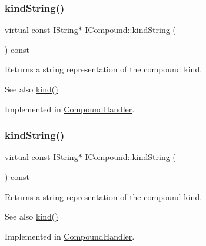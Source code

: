 \subsubsection{\texorpdfstring{kindString()}{kindString()}\hspace{0.1cm}{\footnotesize\ttfamily [1/2]}}
{\footnotesize\ttfamily virtual const \mbox{\hyperlink{class_i_string}{I\+String}}$\ast$ I\+Compound\+::kind\+String (\begin{DoxyParamCaption}{ }\end{DoxyParamCaption}) const\hspace{0.3cm}{\ttfamily [pure virtual]}}

Returns a string representation of the compound kind. \begin{DoxySeeAlso}{See also}
\mbox{\hyperlink{class_i_compound_ad0d6fb22a48b5bbddae2b88a3cab3640}{kind()}} 
\end{DoxySeeAlso}


Implemented in \mbox{\hyperlink{class_compound_handler_a8564086585b4054a14ae9548dabed0ca}{Compound\+Handler}}.

\mbox{\label{class_i_compound_a49a7cb96ed8364494bdb7ecc1abb86c9}} 
\subsubsection{\texorpdfstring{kindString()}{kindString()}\hspace{0.1cm}{\footnotesize\ttfamily [2/2]}}
{\footnotesize\ttfamily virtual const \mbox{\hyperlink{class_i_string}{I\+String}}$\ast$ I\+Compound\+::kind\+String (\begin{DoxyParamCaption}{ }\end{DoxyParamCaption}) const\hspace{0.3cm}{\ttfamily [pure virtual]}}

Returns a string representation of the compound kind. \begin{DoxySeeAlso}{See also}
\mbox{\hyperlink{class_i_compound_ad0d6fb22a48b5bbddae2b88a3cab3640}{kind()}} 
\end{DoxySeeAlso}


Implemented in \mbox{\hyperlink{class_compound_handler_a8564086585b4054a14ae9548dabed0ca}{Compound\+Handler}}.

\mbox{\label{class_i_compound_af30652d3b5a43722e9407c8edf9a38fb}} 
